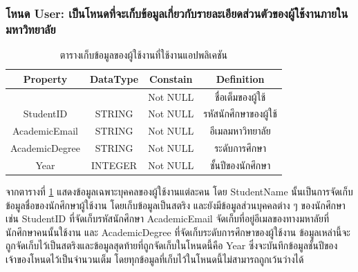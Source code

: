 \documentclass[14pt,oneside,openright,a4paper]{cpe-thai-project}
\begin{document}
    \subsubsection{โหนด User: เป็นโหนดที่จะเก็บข้อมูลเกี่ยวกับรายละเอียดส่วนตัวของผู้ใช้งานภายในมหาวิทยาลัย}
    \begin{table}[!h]\centering
      \begin{tabular}{|c|c|c|c|}
      \hline
      \rowcolor[HTML]{9FC5E8} 
      Property       & {\color[HTML]{242424} DataType} & Constain & Definition            \\ \hline
      \cellcolor[HTML]{FFFFFF}{\color[HTML]{242424} StudentName} & \cellcolor[HTML]{FFFFFF}{\color[HTML]{242424} STRING} & Not NULL & ชื่อเต็มของผู้ใช้ \\ \hline
      StudentID      & STRING                          & Not NULL & รหัสนักศึกษาของผู้ใช้ \\ \hline
      AcademicEmail  & STRING                          & Not NULL & อีเมลมหาวิทยาลัย      \\ \hline
      AcademicDegree & STRING                          & Not NULL & ระดับการศึกษา         \\ \hline
      Year           & INTEGER                         & Not NULL & ชั้นปีของนักศึกษา     \\ \hline
      \end{tabular}
      \caption{\centering ตารางเก็บข้อมูลของผู้ใช้งานที่ใช้งานแอปพลิเคชัน}\label{tab:User Node}
    \end{table}
    จากตารางที่ \ref{tab:User Node} แสดงข้อมูลเฉพาะบุคคลของผู้ใช้งานแต่ละคน โดย StudentName นั้นเป็นการจัดเก็บข้อมูลชื่อของนักศึกษาผู้ใช้งาน โดยเก็บข้อมูลเป็นสตริง และยังมีข้อมูลส่วนบุคคลต่าง ๆ ของนักศึกษา เช่น StudentID ที่จัดเก็บรหัสนักศึกษา AcademicEmail จัดเก็บที่อยู่อีเมลของทางมหาลัยที่นักศึกษาคนนั้นใช้งาน และ AcademicDegree ที่จัดเก็บระดับการศึกษาของผู้ใช้งาน ข้อมูลเหล่านี้จะถูกจัดเก็บไว้เป็นสตริงและข้อมูลสุดท้ายที่ถูกจัดเก็บในโหนดนี้คือ Year ซึ่งจะบันทึกข้อมูลชั้นปีของเจ้าของโหนดไว้เป็นจำนวนเต็ม โดยทุกข้อมูลที่เก็บไว้ในโหนดนี้ไม่สามารถถูกเว้นว่างได้
\end{document}
